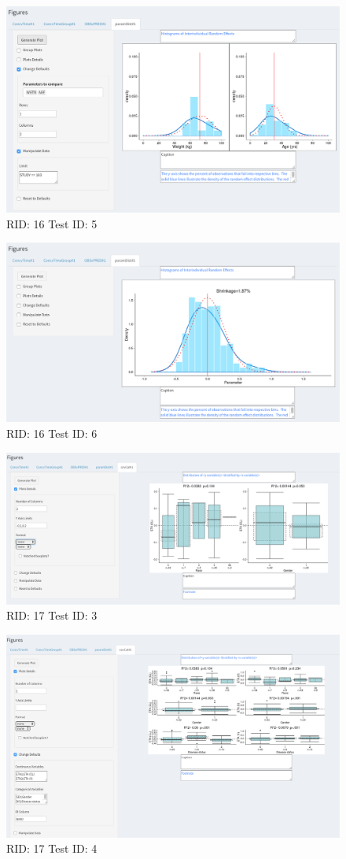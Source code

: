 \begin{figure}[H]
\includegraphics[width=.8\textwidth]{screencaps/16-5-1.png}
\caption{RID: 16 Test ID: 5}
\end{figure}
\begin{figure}[H]
\includegraphics[width=.8\textwidth]{screencaps/16-6-1.png}
\caption{RID: 16 Test ID: 6}
\end{figure}
\begin{figure}[H]
\includegraphics[width=.8\textwidth]{screencaps/17-3-1.png}
\caption{RID: 17 Test ID: 3}
\end{figure}
\begin{figure}[H]
\includegraphics[width=.8\textwidth]{screencaps/17-4-1.png}
\caption{RID: 17 Test ID: 4}
\end{figure}
